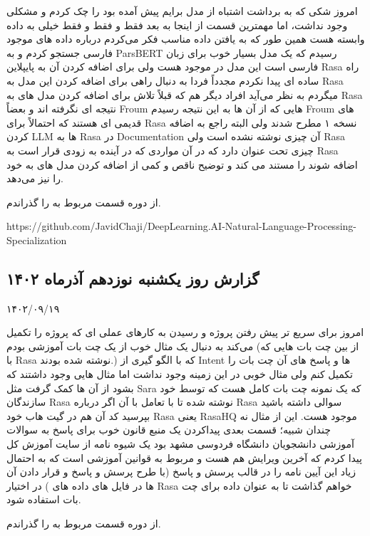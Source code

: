 امروز شکی که به برداشت اشتباه از مدل برایم پیش آمده بود را چک کردم و مشکلی وجود نداشت، اما مهمترین قسمت از اینجا به بعد فقط و فقط و فقط خیلی به داده وابسته هست
همین طور که به یافتن داده مناسب فکر می‌کردم درباره داده های موجود فارسی جستجو کردم و به ParsBERT رسیدم که یک مدل بسیار خوب برای زبان فارسی است این مدل در  موجود هست ولی برای اضافه کردن آن به پایپلاین Rasa راه ساده ای پیدا نکردم مجدداً فردا به دنبال راهی برای اضافه کردن این مدل به Rasa میگردم به نظر می‌آید افراد دیگر هم که قبلاً تلاش برای اضافه کردن مدل های  به Rasa نتیجه ای نگرفته اند و بعضاً Froum هایی که از آن ها به این نتیجه رسیدم Froum های قدیمی ای هستند که احتمالاً برای Rasa نسخه ۱ مطرح شدند ولی البته راجع به اضافه کردن LLM ها به Rasa در Documentation آن چیزی نوشته نشده است ولی Rasa چیزی تحت عنوان  دارد که در آن مواردی که در آینده به زودی قرار است به Rasa اضافه شوند را مستند می کند و توضیح ناقص و کمی از اضافه کردن مدل های  به خود را نیز می‌دهد.

از دوره  قسمت مربوط به  را گذراندم.

https://github.com/JavidChaji/DeepLearning.AI-Natural-Language-Processing-Specialization


\subsection{گزارش روز یکشنبه نوزدهم آذرماه ۱۴۰۲}

۱۴۰۲/۰۹/۱۹

امروز برای سریع تر پیش رفتن پروژه و رسیدن به کارهای عملی ای که پروژه را تکمیل می‌کند به دنبال یک مثال خوب از یک چت بات آموزشی بودم (از بین چت بات هایی که با Rasa نوشته شده بودند.) که با الگو گیری از Intent ها و پاسخ های آن چت بات را تکمیل کنم ولی مثال خوبی در این زمینه وجود نداشت اما مثال هایی وجود داشتند که بشود از آن ها کمک گرفت مثل Sara که یک نمونه چت بات کامل هست که توسط خود سازندگان Rasa نوشته شده تا با تعامل با آن اگر درباره Rasa سوالی داشته باشید بپرسید کد آن هم در گیت هاب خود Rasa یعنی RasaHQ موجود هست. این از مثال نه چندان شبیه؛ قسمت بعدی پیداکردن یک منبع قانون خوب برای پاسخ به سوالات آموزشی دانشجویان دانشگاه فردوسی مشهد بود یک شیوه نامه\cite{1} از سایت آموزش کل پیدا کردم که آخرین ویرایش هم هست و مربوط به قوانین آموزشی است که به احتمال زیاد این آیین نامه را در قالب پرسش و پاسخ (با طرح پرسش و پاسخ و قرار دادن آن ها در فایل های داده های ) در اختیار Rasa خواهم گذاشت تا به عنوان داده برای چت بات استفاده شود.

از دوره  قسمت مربوط به  را گذراندم.

